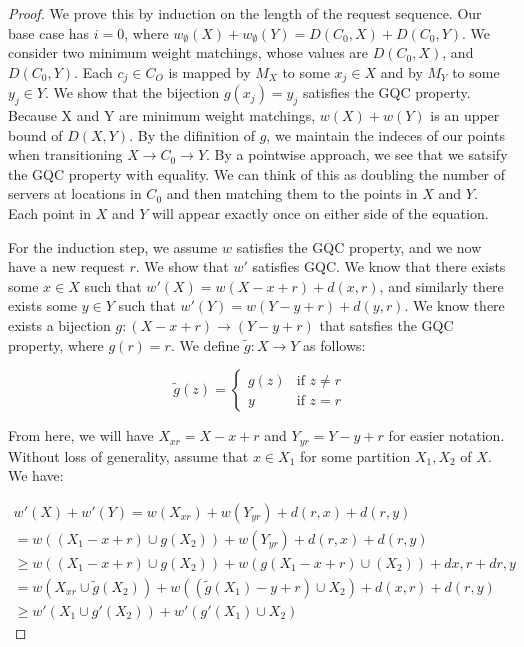 \begin{proof}
    We prove this by induction on the length of the request sequence. Our base case has $i = 0$, where $w_{\emptyset}(X) + w_{\emptyset}(Y) = D(C_0, X) + D(C_0, Y)$. We consider two minimum weight matchings, whose values are $D(C_0, X)$, and $D(C_0, Y)$. Each $c_j \in C_O$ is mapped by $M_X$ to some $x_j \in X$ and by $M_Y$ to some $y_j \in Y$. We show that the bijection $g(x_j) = y_j$ satisfies the GQC property. Because X and Y are minimum weight matchings, $w(X) + w(Y)$ is an upper bound of $D(X, Y)$. By the difinition of $g$, we maintain the indeces of our points when transitioning $X \rightarrow C_0 \rightarrow Y$. By a pointwise approach, we see that we satsify the GQC property with equality. We can think of this as doubling the number of servers at locations in $C_0$ and then matching them to the points in $X$ and $Y$. Each point in $X$ and $Y$ will appear exactly once on either side of the equation.

    For the induction step, we assume $w$ satisfies the GQC property, and we now have a new request $r$. We show that $w'$ satisfies GQC. We know that there exists some $x \in X$ such that $w'(X) = w(X-x+r) + d(x,r)$, and similarly there exists some $y \in Y$ such that $w'(Y) = w(Y-y+r) + d(y,r)$. We know there exists a bijection $g: (X-x+r) \rightarrow (Y-y+r)$ that satsfies the GQC property, where $g(r) = r$. We define $\tilde{g}: X \rightarrow Y$ as follows:

    \begin{equation*}
        \tilde{g}(z) = \begin{cases}
            g(z) & \text{if } z \neq r \\
            y & \text{if } z = r
        \end{cases}
    \end{equation*}

    From here, we will have $X_{xr} = X - x + r$ and $Y_{yr} = Y - y + r$ for easier notation. Without loss of generality, assume that $x \in X_1$ for some partition $X_1, X_2$ of $X$. We have:

    \begin{equation*}
        \begin{gathered}
            w'(X) + w'(Y) = w(X_{xr}) + w(Y_{yr}) + d(r, x) + d(r, y) \\
            = w( (X_1-x+r) \cup g(X_2)) + w(Y_{yr}) + d(r, x) + d(r, y) \\
            \geq w((X_1-x+r) \cup g(X_2)) + w(g(X_1-x+r) \cup (X_2)) + d{x, r} + d{r, y} \\
            = w(X_{xr} \cup \tilde{g}(X_2)) + w((\tilde{g}(X_1) -y + r) \cup X_2) + d(x, r) + d(r, y) \\
            \geq w'(X_1 \cup g'(X_2)) + w'(g'(X_1) \cup X_2) 
        \end{gathered}
    \end{equation*}
\end{proof}

